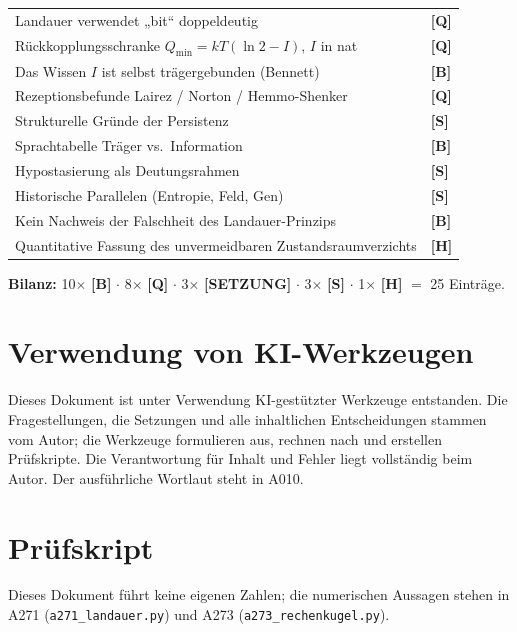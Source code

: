 \begin{center}
\begin{longtable}{@{}p{}l@{}}
Landauer verwendet „bit“ doppeldeutig & \textbf{[Q]} \\
Rückkopplungsschranke $Q_{\min} = kT(\ln 2 - I)$, $I$ in nat & \textbf{[Q]} \\
Das Wissen $I$ ist selbst trägergebunden (Bennett) & \textbf{[B]} \\
Rezeptionsbefunde Lairez / Norton / Hemmo-Shenker & \textbf{[Q]} \\
Strukturelle Gründe der Persistenz & \textbf{[S]} \\
Sprachtabelle Träger vs.\ Information & \textbf{[B]} \\
Hypostasierung als Deutungsrahmen & \textbf{[S]} \\
Historische Parallelen (Entropie, Feld, Gen) & \textbf{[S]} \\
Kein Nachweis der Falschheit des Landauer-Prinzips & \textbf{[B]} \\
Quantitative Fassung des unvermeidbaren Zustandsraumverzichts & \textbf{[H]} \\
\bottomrule
\end{longtable}
\end{center}

\textbf{Bilanz:} 10$\times$ \textbf{[B]} $\cdot$ 8$\times$ \textbf{[Q]} $\cdot$ 3$\times$ \textbf{[SETZUNG]}
$\cdot$ 3$\times$ \textbf{[S]} $\cdot$ 1$\times$ \textbf{[H]} $=$ 25 Einträge.

\section{Verwendung von KI-Werkzeugen}

Dieses Dokument ist unter Verwendung KI-gestützter Werkzeuge entstanden. Die
Fragestellungen, die Setzungen und alle inhaltlichen Entscheidungen stammen vom
Autor; die Werkzeuge formulieren aus, rechnen nach und erstellen Prüfskripte.
Die Verantwortung für Inhalt und Fehler liegt vollständig beim Autor. Der
ausführliche Wortlaut steht in A010.

\section{Prüfskript}

Dieses Dokument führt keine eigenen Zahlen; die numerischen Aussagen stehen in
A271 (\texttt{a271\_landauer.py}) und A273 (\texttt{a273\_rechenkugel.py}).

